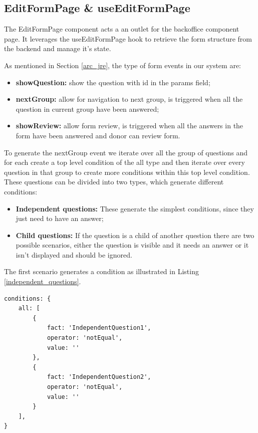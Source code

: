 \newpage

\subsection{EditFormPage \& useEditFormPage}
The EditFormPage component acts a an outlet for the backoffice component page. It leverages the useEditFormPage hook to retrieve the form structure from the backend and manage it's state.

As mentioned in Section \ref{arc_jre}, the type of form events in our system are:
\begin{itemize}
	\item \textbf{showQuestion:} show the question with id in the params field;
	\item \textbf{nextGroup:} allow for navigation to next group, is triggered when all the question in current group have been answered;
	\item \textbf{showReview:} allow form review, is triggered when all the answers in the form have been answered and donor can review form.
\end{itemize}

To generate the nextGroup event we iterate over all the group of questions and for each create a top level condition of the all type and then iterate over every question in that group to create more conditions within this top level condition.
These questions can be divided into two types, which generate different conditions:
\begin{itemize}
	\item \textbf{Independent questions:} These generate the simplest conditions, since they just need to have an answer;
	\item \textbf{Child questions:} If the question is a child of another question there are two possible scenarios, either the question is visible and it needs an answer or it isn't displayed and should be ignored. 
\end{itemize}

The first scenario generates a condition as illustrated in Listing \ref{independent_questions}.
\begin{lstlisting}[style=sharpc, caption={Condition generated by an independent questions}, label={independent_questions}]
conditions: {
	all: [
		{
			fact: 'IndependentQuestion1',
			operator: 'notEqual',
			value: ''
		},
		{
			fact: 'IndependentQuestion2',
			operator: 'notEqual',
			value: ''
		}
	],
}
\end{lstlisting}

